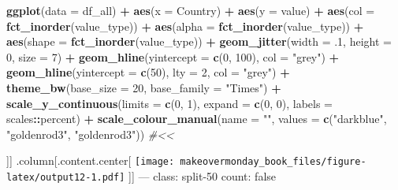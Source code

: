 \documentclass[]{book}
\newenvironment{Shaded}{\begin{snugshade}}{\end{snugshade}}
\newcommand{\KeywordTok}[1]{\textcolor[rgb]{0.13,0.29,0.53}{\textbf{#1}}}
\newcommand{\DataTypeTok}[1]{\textcolor[rgb]{0.13,0.29,0.53}{#1}}
\newcommand{\DecValTok}[1]{\textcolor[rgb]{0.00,0.00,0.81}{#1}}
\newcommand{\StringTok}[1]{\textcolor[rgb]{0.31,0.60,0.02}{#1}}
\newcommand{\CommentTok}[1]{\textcolor[rgb]{0.56,0.35,0.01}{\textit{#1}}}
\newcommand{\OperatorTok}[1]{\textcolor[rgb]{0.81,0.36,0.00}{\textbf{#1}}}
\newcommand{\NormalTok}[1]{#1}
\theoremstyle{definition}
\theoremstyle{definition}
\theoremstyle{definition}
\theoremstyle{remark}
\begin{document}
\begin{Shaded}
\begin{Highlighting}[]
\KeywordTok{ggplot}\NormalTok{(}\DataTypeTok{data =}\NormalTok{ df_all) }\OperatorTok{+}
\StringTok{  }\KeywordTok{aes}\NormalTok{(}\DataTypeTok{x =}\NormalTok{ Country) }\OperatorTok{+}
\StringTok{  }\KeywordTok{aes}\NormalTok{(}\DataTypeTok{y =}\NormalTok{ value) }\OperatorTok{+}
\StringTok{  }\KeywordTok{aes}\NormalTok{(}\DataTypeTok{col =} \KeywordTok{fct_inorder}\NormalTok{(value_type)) }\OperatorTok{+}
\StringTok{  }\KeywordTok{aes}\NormalTok{(}\DataTypeTok{alpha =} \KeywordTok{fct_inorder}\NormalTok{(value_type)) }\OperatorTok{+}
\StringTok{  }\KeywordTok{aes}\NormalTok{(}\DataTypeTok{shape =} \KeywordTok{fct_inorder}\NormalTok{(value_type)) }\OperatorTok{+}
\StringTok{  }\KeywordTok{geom_jitter}\NormalTok{(}\DataTypeTok{width =}\NormalTok{ .}\DecValTok{1}\NormalTok{, }\DataTypeTok{height =} \DecValTok{0}\NormalTok{, }\DataTypeTok{size =} \DecValTok{7}\NormalTok{) }\OperatorTok{+}
\StringTok{  }\KeywordTok{geom_hline}\NormalTok{(}\DataTypeTok{yintercept =} \KeywordTok{c}\NormalTok{(}\DecValTok{0}\NormalTok{, }\DecValTok{100}\NormalTok{), }\DataTypeTok{col =} \StringTok{"grey"}\NormalTok{) }\OperatorTok{+}
\StringTok{  }\KeywordTok{geom_hline}\NormalTok{(}\DataTypeTok{yintercept =} \KeywordTok{c}\NormalTok{(}\DecValTok{50}\NormalTok{), }\DataTypeTok{lty =} \DecValTok{2}\NormalTok{, }\DataTypeTok{col =} \StringTok{"grey"}\NormalTok{) }\OperatorTok{+}
\StringTok{  }\KeywordTok{theme_bw}\NormalTok{(}\DataTypeTok{base_size =} \DecValTok{20}\NormalTok{, }\DataTypeTok{base_family =} \StringTok{"Times"}\NormalTok{) }\OperatorTok{+}
\StringTok{  }\KeywordTok{scale_y_continuous}\NormalTok{(}\DataTypeTok{limits =} \KeywordTok{c}\NormalTok{(}\DecValTok{0}\NormalTok{, }\DecValTok{1}\NormalTok{), }\DataTypeTok{expand =} \KeywordTok{c}\NormalTok{(}\DecValTok{0}\NormalTok{, }\DecValTok{0}\NormalTok{), }\DataTypeTok{labels =}\NormalTok{ scales}\OperatorTok{::}\NormalTok{percent) }\OperatorTok{+}
\StringTok{  }\KeywordTok{scale_colour_manual}\NormalTok{(}\DataTypeTok{name =} \StringTok{""}\NormalTok{, }\DataTypeTok{values =} \KeywordTok{c}\NormalTok{(}\StringTok{"darkblue"}\NormalTok{, }\StringTok{"goldenrod3"}\NormalTok{, }\StringTok{"goldenrod3"}\NormalTok{))  }\CommentTok{#<<}
\end{Highlighting}
\end{Shaded}

{]}{]} .column{[}.content.center{[}
\texttt{[image: makeovermonday\_book\_files/figure-latex/output12-1.pdf]}
{]}{]} --- class: split-50 count: false
\end{document}
